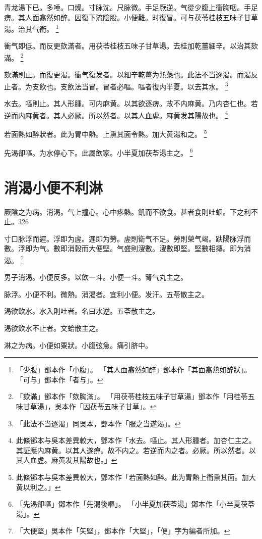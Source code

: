 青龙湯下已。多唾。口燥。寸脉沈。尺脉微。手足厥逆。气從少腹上衝胸咽。手足痹。其人面翕然如醉。因復下流陰股。小便難。时復冒。可与茯苓桂枝五味子甘草湯。治其气衝。
	\footnote{
		「少腹」鄧本作「小腹」。
		「其人面翕然如醉」鄧本作「其面翕熱如醉狀」。
		「可与」鄧本作「者与」。
	}

衝气即低。而反更欬滿者。用茯苓桂枝五味子甘草湯。去桂加乾薑細辛。以治其欬滿。
	\footnote{
		「欬滿」鄧本作「欬胸滿」。
		「用茯苓桂枝五味子甘草湯」鄧本作「用桂苓五味甘草湯」，吳本作「因茯苓五味子甘草」。
	}

欬滿則止。而復更渴。衝气復发者。以細辛乾薑为熱藥也。此法不当逐渴。而渴反止者。为支飲也。支飲法当冒。冒者必嘔。嘔者復内半夏。以去其水。
	\footnote{
		「此法不当逐渴」同吳本，鄧本作「服之当遂渴」。
	}

水去。嘔則止。其人形腫。可内麻黄。以其欲逐痹。故不内麻黄。乃内杏仁也。若逆而内麻黄者。其人必厥。所以然者。以其人血虗。麻黄发其陽故也。
	\footnote{
		此條鄧本与吳本差異較大，鄧本作「水去。嘔止。其人形腫者。加杏仁主之。其証應内麻黄。以其人遂痹。故不内之。若逆而内之者。必厥。所以然者。以其人血虗。麻黄发其陽故也。」
	}

若面熱如醉狀者。此为胃中熱。上熏其面令熱。加大黄湯和之。
	\footnote{
		此條鄧本与吳本差異較大，鄧本作「若面熱如醉。此为胃熱上衝熏其面。加大黄以利之。」
	}

先渴卻嘔。为水停心下。此屬飲家。小半夏加茯苓湯主之。
	\footnote{
		「先渴卻嘔」鄧本作「先渴後嘔」。
		「小半夏加茯苓湯」鄧本作「小半夏茯苓湯」。
	}

\chapter{消渴小便{\khaai 不}利淋}

厥陰之为病。消渴。气上撞心。心中疼熱。飢而不欲食。{\khaai 甚者}食則吐{\khaai 蛔}。下之利不止。326

寸口脉浮而遲。浮即为虗。遲即为勞。虗則衛气不足。勞則榮气竭。趺陽脉浮而數。浮即为气。數即消穀而大{\khaai 便}堅。气盛則溲數。溲數即堅。堅數相摶。即为消渴。
	\footnote{
		「大便堅」吳本作「矢堅」，鄧本作「大堅」，「便」字为編者所加。
	}

男子消渴。小便反多。以飲一斗。小便一斗。腎气丸主之。

脉浮。小便不利。微熱。消渴者。宜利小便。发汗。五苓散主之。

渴欲飲水。水入則吐者。名曰水逆。五苓散主之。

渴欲飲水不止者。文蛤散主之。

淋之为病。小便如粟狀。小腹弦急。痛引脐中。

